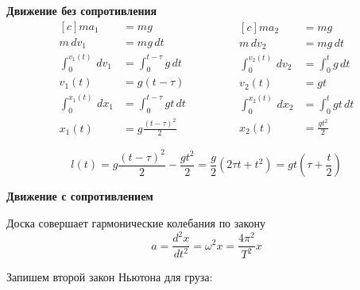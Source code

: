 \documentclass[a5paper,10pt]{article}
\begin{document}
\textbf{Движение без сопротивления}
\begin{equation*}
    \begin{aligned}[c]
        ma_1&=mg\\
        m\,dv_1&=mg\,dt\\
        \int_0^{v_1(t)}\,dv_1&=\int_0^{t-\tau} g\,dt\\   
        v_1(t)&=g(t-\tau)\\
        \int_0^{x_1(t)}\,dx_1&=\int_0^{t-\tau} gt\,dt\\ 
        x_1(t)&=g\frac{(t-\tau)^2}{2}
    \end{aligned}
        \qquad\qquad
    \begin{aligned}[c]
        ma_2&=mg\\
        m\,dv_2&=mg\,dt\\
        \int_0^{v_2(t)}\,dv_2&=\int_0^t g\,dt\\   
        v_2(t)&=gt\\
        \int_0^{x_2(t)}\,dx_2&=\int_0^t gt\,dt\\ 
        x_2(t)&=\frac{gt^2}{2}
    \end{aligned}
\end{equation*}

\begin{equation*}
     l(t)=g\frac{(t-\tau)^2}{2}-\frac{gt^2}{2}=\frac{g}{2}(2\tau{t}+t^2)=gt(\tau+ \frac{t}{2} )
\end{equation*}

\textbf{Движение с сопротивлением}

Доска совершает гармонические колебания по закону
\begin{equation*}
     a=\frac{d^2x}{dt^2}=\omega^2x=\frac{4\pi^2}{T^2}x
 \end{equation*} 

Запишем второй закон Ньютона для груза:
\end{document}
